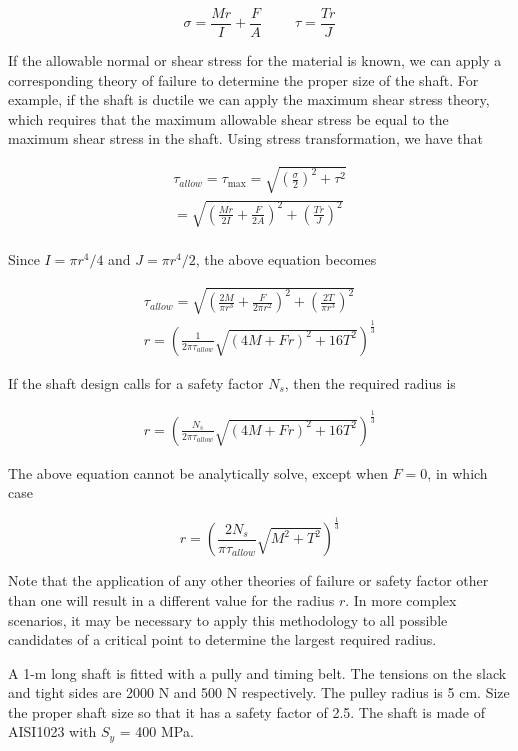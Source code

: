 \documentclass[a4paper,openany,12pt]{book}
\begin{document}
{{$$\sigma  = \frac{Mr}{I} + \frac{F}{A} \hspace{1cm} \tau  = \frac{Tr}{J}$$

If the allowable normal or shear stress for the material is known, we
can apply a corresponding theory of failure to determine the proper size
of the shaft. For example, if the shaft is ductile we can apply the
maximum shear stress theory, which requires that the maximum allowable
shear stress be equal to the maximum shear stress in the shaft. Using
stress transformation, we have that

$$\begin{gathered}
    \tau_{allow} = \tau_{\max} = \sqrt {\left( \frac{\sigma}{2} \right)^2 + {\tau ^2}}  \\ 
    = \sqrt{ \left( \frac{Mr}{2I} + \frac{F}{2A} \right)^2 + \left( \frac{Tr}{J} \right)^2}  \\ 
  \end{gathered}$$

Since \(I = \pi r^4/4\) and \(J = \pi r^4/2\), the above equation becomes

$$\begin{gathered}
    \tau_{allow} = \sqrt{ \left( \frac{2M}{\pi r^3} + \frac{F}{2 \pi r^2} \right)^2 + \left( \frac{2T}{\pi r^3} \right)^2 } \\
    r = \left( \frac{1}{2 \pi \tau _{allow}} \sqrt {(4M + Fr)^2 + 16T^2 } \right)^{\frac{1}{3}}
  \end{gathered}$$

If the shaft design calls for a safety factor \(N_s\), then the required
radius is

$$\begin{gathered}
  r = \left( \frac{N_s}{2 \pi \tau _{allow}} \sqrt {(4M + Fr)^2 + 16T^2} \right)^{\frac{1}{3}}\end{gathered}$$

The above equation cannot be analytically solve, except when \(F=0\), in
which case

$$ r = \left( \frac{2 N_s}{\pi \tau_{allow}}\sqrt {M^2 + T^2} \right)^{\frac{1}{3}}$$

Note that the application of any other theories of failure or safety
factor other than one will result in a different value for the radius
\(r\). In more complex scenarios, it may be necessary to apply this
methodology to all possible candidates of a critical point to determine
the largest required radius.

A 1-m long shaft is fitted with a pully and timing belt. The tensions on
the slack and tight sides are 2000 N and 500 N respectively. The pulley
radius is 5 cm. Size the proper shaft size so that it has a safety
factor of 2.5. The shaft is made of AISI1023 with \(S_y\) = 400 MPa.


}}
\end{document}
